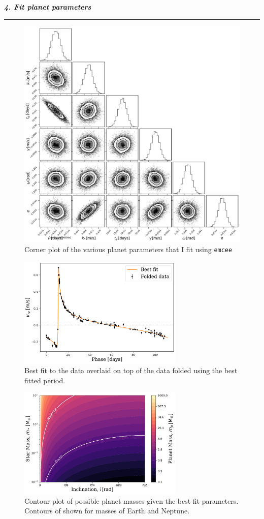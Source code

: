 \documentclass[12pt, letterpaper, twoside]{article}
\newcommand{\question}[1]{{\noindent \it #1}}
\newcommand{\answer}[1]{
    \par\noindent\rule{\textwidth}{0.4pt}#1\vspace{0.5cm}
}
\begin{document}
\question{\textbf{4. Fit planet parameters}}
\answer{
    \begin{figure}
        \centering
        \includegraphics[width=\textwidth]{figures/mcmc_corner.pdf}
        \caption{Corner plot of the various planet parameters that I fit using \texttt{emcee}}
    \end{figure}

    \begin{figure}
        \centering
        \includegraphics[width=0.7\textwidth]{figures/best_fit.pdf}
        \caption{Best fit to the data overlaid on top of the data folded using the best fitted period.}
    \end{figure}

    \begin{figure}
        \centering
        \includegraphics[width=0.7\textwidth]{figures/planet_mass.pdf}
        \caption{Contour plot of possible planet masses given the best fit parameters. Contours of shown for masses of Earth and Neptune.}
    \end{figure}
}
\end{document}
